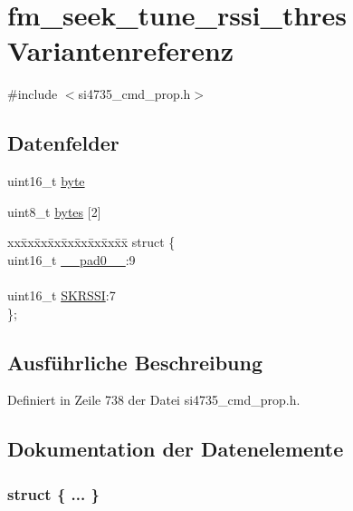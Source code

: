 \hypertarget{unionfm__seek__tune__rssi__thres}{}\section{fm\+\_\+seek\+\_\+tune\+\_\+rssi\+\_\+thres Variantenreferenz}
\label{unionfm__seek__tune__rssi__thres}


{\ttfamily \#include $<$si4735\+\_\+cmd\+\_\+prop.\+h$>$}

\subsection*{Datenfelder}
\begin{DoxyCompactItemize}
\item 
uint16\+\_\+t \hyperlink{unionfm__seek__tune__rssi__thres_ab0549c1b5ea980a02e7eab77e21fea49}{byte}
\item 
uint8\+\_\+t \hyperlink{unionfm__seek__tune__rssi__thres_a46e4c05d20a047ec169f60d3167e912e}{bytes} \mbox{[}2\mbox{]}
\item 
\begin{tabbing}
xx\=xx\=xx\=xx\=xx\=xx\=xx\=xx\=xx\=\kill
struct \{\\
\>uint16\_t \hyperlink{unionfm__seek__tune__rssi__thres_a77132c2c26a75f5b8751b235cda23828}{\_\_pad0\_\_}:9\\
\>\\
\>uint16\_t \hyperlink{unionfm__seek__tune__rssi__thres_aa2c04a5a0172c82e128c710e747f345e}{SKRSSI}:7\\
\}; \\

\end{tabbing}\end{DoxyCompactItemize}


\subsection{Ausführliche Beschreibung}


Definiert in Zeile 738 der Datei si4735\+\_\+cmd\+\_\+prop.\+h.



\subsection{Dokumentation der Datenelemente}
\hypertarget{unionfm__seek__tune__rssi__thres_a57b4dae392e5539512c3d82d7eecb0f6}{}\subsubsection[{"@89}]{\setlength{\rightskip}{0pt plus 5cm}struct \{ ... \} }\label{unionfm__seek__tune__rssi__thres_a57b4dae392e5539512c3d82d7eecb0f6}
\hypertarget{unionfm__seek__tune__rssi__thres_a77132c2c26a75f5b8751b235cda23828}{}
